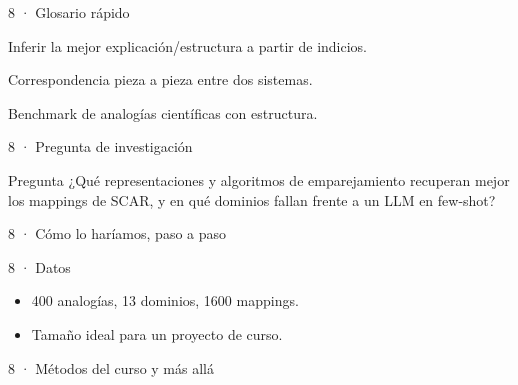 \begin{frame}{8 · Glosario rápido}
  \begin{description}[font=\bfseries\scriptsize,style=nextline,leftmargin=1.8cm]
    \item[Abducción] Inferir la mejor explicación/estructura a partir de indicios.
    \item[Mapping] Correspondencia pieza a pieza entre dos sistemas.
    \item[SCAR] Benchmark de analogías científicas con estructura.
  \end{description}
\end{frame}

\begin{frame}{8 · Pregunta de investigación}
  \begin{block}{Pregunta}
    ¿Qué representaciones y algoritmos de emparejamiento recuperan mejor los mappings de SCAR, y en qué dominios fallan frente a un LLM en few-shot?
  \end{block}
\end{frame}

\begin{frame}{8 · Cómo lo haríamos, paso a paso}
\end{frame}

\begin{frame}{8 · Datos}
  \begin{itemize}
    \item 400 analogías, 13 dominios, 1600 mappings.
    \item Tamaño ideal para un proyecto de curso.
  \end{itemize}
\end{frame}

\begin{frame}{8 · Métodos del curso y más allá}
\end{frame}

